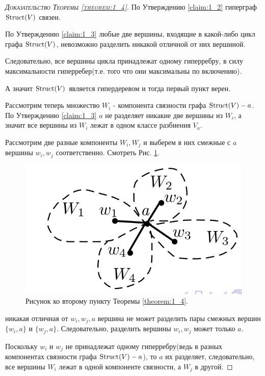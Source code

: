 \documentclass[../main.tex]{subfiles}
\begin{document}
\begin{proof}[\normalfont\textsc{Доказательство Теоремы \ref{theorem:1_4}}]
	По Утверждению \ref{claim:1_2} гиперграф $\operatorname{Struct}(V)$ связен.

	По Утверждению \ref{claim:1_3} любые две вершины, входящие в какой-либо цикл графа $\operatorname{Struct}(V)$, невозможно разделить никакой отличной от них вершиной.

	Следовательно, все вершины цикла принадлежат одному гиперребру, в силу максимальности гиперребер(т.е. того что они максимальны по включению).

	А значит $\operatorname{Struct}(V)$ является гипердеревом и тогда первый пункт верен.

	Рассмотрим теперь множество $W_i$ - компонента связности графа  $\operatorname{Struct}(V) - a$.
	По Утверждению \ref{claim:1_3}  $a$ не разделяет никакие две вершины из $W_i$, а значит все вершины из $W_i$ лежат в одном классе разбиения $V_a$.

	Рассмотрим две разные компоненты  $W_i, W_j$ и выберем в них смежные с  $a$ вершины $w_i, w_j$ соответственно. Смотреть Рис. \ref{fig:theorem_1_4}.

\begin{figure}[ht]
    \centering
	\includegraphics[width=0.4\columnwidth]{figures/theorem_1_4.png}
	\caption{Рисунок ко второму пункту Теоремы \ref{theorem:1_4}.}
    \label{fig:theorem_1_4}
\end{figure}

никакая отличная от $w_i, w_j, a$ вершина не может разделить пары смежных вершин  $\{w_i, a\}$ и  $\{w_j, a\}$. Следовательно, разделить вершины  $w_i, w_j$ может только  $a$.

Поскольку  $w_i$ и  $w_j$ не принадлежат одному гиперребру(ведь в разных компонентах связности графа $\operatorname{Struct}(V) - a$), то $a$ их разделяет, следовательно, все вершины $W_i$ лежат в одной компоненте связности, а  $W_j$ в другой.


\end{proof}
\end{document}
